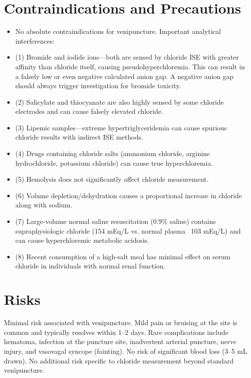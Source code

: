 \section*{Contraindications and Precautions}
\begin{itemize}
  \item No absolute contraindications for venipuncture. Important analytical interferences:
  \item (1) Bromide and iodide ions---both are sensed by chloride ISE with greater affinity than chloride itself, causing pseudohyperchloremia. This can result in a falsely low or even negative calculated anion gap. A negative anion gap should always trigger investigation for bromide toxicity.
  \item (2) Salicylate and thiocyanate are also highly sensed by some chloride electrodes and can cause falsely elevated chloride.
  \item (3) Lipemic samples---extreme hypertriglyceridemia can cause spurious chloride results with indirect ISE methods.
  \item (4) Drugs containing chloride salts (ammonium chloride, arginine hydrochloride, potassium chloride) can cause true hyperchloremia.
  \item (5) Hemolysis does not significantly affect chloride measurement.
  \item (6) Volume depletion/dehydration causes a proportional increase in chloride along with sodium.
  \item (7) Large-volume normal saline resuscitation (0.9\% saline) contains supraphysiologic chloride (154 mEq/L vs. normal plasma ~103 mEq/L) and can cause hyperchloremic metabolic acidosis.
  \item (8) Recent consumption of a high-salt meal has minimal effect on serum chloride in individuals with normal renal function.
\end{itemize}
\section*{Risks}
Minimal risk associated with venipuncture. Mild pain or bruising at the site is common and typically resolves within 1--2 days. Rare complications include hematoma, infection at the puncture site, inadvertent arterial puncture, nerve injury, and vasovagal syncope (fainting). No risk of significant blood loss (3--5 mL drawn). No additional risk specific to chloride measurement beyond standard venipuncture.

